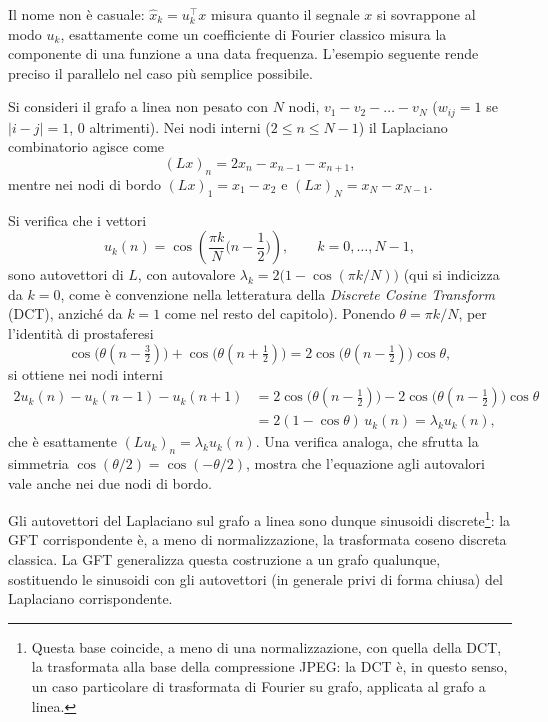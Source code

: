 Il nome non è casuale: $\hat x_k = u_k^\top x$ misura quanto il segnale $x$ si sovrappone al modo $u_k$, esattamente come un coefficiente di Fourier classico misura la componente di una funzione a una data frequenza. L'esempio seguente rende preciso il parallelo nel caso più semplice possibile.

\begin{example}
\label{ex:path-graph}
Si consideri il grafo a linea non pesato con $N$ nodi, $v_1-v_2-\dots-v_N$ ($w_{ij}=1$ se $|i-j|=1$, $0$ altrimenti). Nei nodi interni ($2\leq n\leq N-1$) il Laplaciano combinatorio agisce come
$$(Lx)_n = 2x_n - x_{n-1} - x_{n+1},$$
mentre nei nodi di bordo $(Lx)_1 = x_1-x_2$ e $(Lx)_N = x_N - x_{N-1}$.

Si verifica che i vettori
$$u_k(n) = \cos\!\left(\frac{\pi k}{N}\Big(n-\frac12\Big)\right), \qquad k=0,\dots,N-1,$$
sono autovettori di $L$, con autovalore $\lambda_k = 2\big(1-\cos(\pi k/N)\big)$ (qui si indicizza da $k=0$, come è convenzione nella letteratura della \emph{Discrete Cosine Transform} (DCT), anziché da $k=1$ come nel resto del capitolo). Ponendo $\theta = \pi k/N$, per l'identità di prostaferesi
$$\cos\big(\theta(n-\tfrac32)\big) + \cos\big(\theta(n+\tfrac12)\big) = 2\cos\big(\theta(n-\tfrac12)\big)\cos\theta,$$
si ottiene nei nodi interni
\begin{align*}
2u_k(n) - u_k(n-1) - u_k(n+1) &= 2\cos\big(\theta(n-\tfrac12)\big) - 2\cos\big(\theta(n-\tfrac12)\big)\cos\theta \\
&= 2(1-\cos\theta)\,u_k(n) = \lambda_k u_k(n),
\end{align*}
che è esattamente $(Lu_k)_n = \lambda_k u_k(n)$. Una verifica analoga, che sfrutta la simmetria $\cos(\theta/2)=\cos(-\theta/2)$, mostra che l'equazione agli autovalori vale anche nei due nodi di bordo.

Gli autovettori del Laplaciano sul grafo a linea sono dunque sinusoidi discrete\footnote{Questa base coincide, a meno di una normalizzazione, con quella della DCT, la trasformata alla base della compressione JPEG: la DCT è, in questo senso, un caso particolare di trasformata di Fourier su grafo, applicata al grafo a linea.}: la GFT corrispondente è, a meno di normalizzazione, la trasformata coseno discreta classica. La GFT generalizza questa costruzione a un grafo qualunque, sostituendo le sinusoidi con gli autovettori (in generale privi di forma chiusa) del Laplaciano corrispondente.
\end{example}

